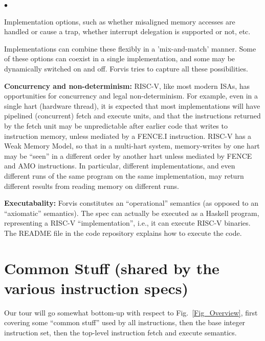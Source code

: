 \documentclass[11pt]{article}
\newenvironment{tightlist}%
{\begin{list}{$\bullet$}{%
    \setlength{\topsep}{0in}
    \setlength{\partopsep}{0in}
    \setlength{\itemsep}{0in}
    \setlength{\parsep}{0in}
    \setlength{\leftmargin}{1.5em}
    \setlength{\rightmargin}{0in}
    \setlength{\itemindent}{0in}
}
}%
{\end{list}
}
\begin{document}
\begin{itemize}
\begin{tightlist}
   \item Implementation options, such as whether misaligned memory
   accesses are handled or cause a trap, whether interrupt delegation
   is supported or not, etc.

  \end{tightlist}

  Implementations can combine these flexibly in a 'mix-and-match'
  manner.  Some of these options can coexist in a single
  implementation, and some may be dynamically switched on and off.
  Forvis tries to capture all these possibilities.

\item {\bf Concurrency and non-determinism:} RISC-V, like most modern
ISAs, has opportunities for concurrency and legal non-determinism.
For example, even in a single hart (hardware thread), it is expected
that most implementations will have pipelined (concurrent) fetch and
execute units, and that the instructions returned by the fetch unit
may be unpredictable after earlier code that writes to instruction
memory, unless mediated by a FENCE.I instruction.  RISC-V has a Weak
Memory Model, so that in a multi-hart system, memory-writes by one
hart may be ``seen'' in a different order by another hart unless
mediated by FENCE and AMO instructions.  In particular, different
implementations, and even different runs of the same program on the
same implementation, may return different results from reading memory
on different runs.

\item {\bf Executabality:} Forvis constitutes an ``operational''
semantics (as opposed to an ``axiomatic'' semantics).  The spec can
actually be executed as a Haskell program, representing a RISC-V
``implementation'', i.e., it can execute RISC-V binaries.  The README
file in the code repository explains how to execute the code.

\end{itemize}


\section{Common Stuff (shared by the various instruction specs)}

\label{sec_common_stuff}

Our tour will go somewhat bottom-up with respect to
Fig.~\ref{Fig_Overview}, first covering some ``common stuff'' used by
all instructions, then the base integer instruction set, then the
top-level instruction fetch and execute semantics.
\end{document}
